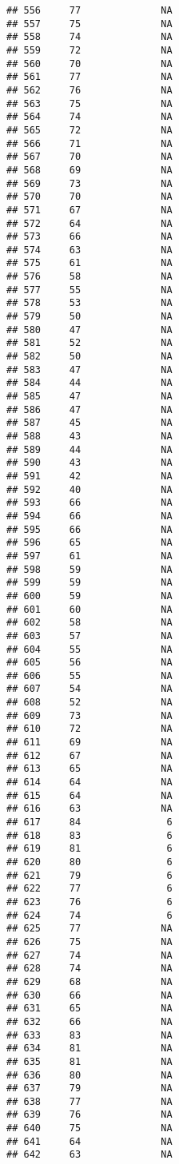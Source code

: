 \documentclass[]{article}
\begin{document}
\begin{verbatim}
## 556     77              NA
## 557     75              NA
## 558     74              NA
## 559     72              NA
## 560     70              NA
## 561     77              NA
## 562     76              NA
## 563     75              NA
## 564     74              NA
## 565     72              NA
## 566     71              NA
## 567     70              NA
## 568     69              NA
## 569     73              NA
## 570     70              NA
## 571     67              NA
## 572     64              NA
## 573     66              NA
## 574     63              NA
## 575     61              NA
## 576     58              NA
## 577     55              NA
## 578     53              NA
## 579     50              NA
## 580     47              NA
## 581     52              NA
## 582     50              NA
## 583     47              NA
## 584     44              NA
## 585     47              NA
## 586     47              NA
## 587     45              NA
## 588     43              NA
## 589     44              NA
## 590     43              NA
## 591     42              NA
## 592     40              NA
## 593     66              NA
## 594     66              NA
## 595     66              NA
## 596     65              NA
## 597     61              NA
## 598     59              NA
## 599     59              NA
## 600     59              NA
## 601     60              NA
## 602     58              NA
## 603     57              NA
## 604     55              NA
## 605     56              NA
## 606     55              NA
## 607     54              NA
## 608     52              NA
## 609     73              NA
## 610     72              NA
## 611     69              NA
## 612     67              NA
## 613     65              NA
## 614     64              NA
## 615     64              NA
## 616     63              NA
## 617     84               6
## 618     83               6
## 619     81               6
## 620     80               6
## 621     79               6
## 622     77               6
## 623     76               6
## 624     74               6
## 625     77              NA
## 626     75              NA
## 627     74              NA
## 628     74              NA
## 629     68              NA
## 630     66              NA
## 631     65              NA
## 632     66              NA
## 633     83              NA
## 634     81              NA
## 635     81              NA
## 636     80              NA
## 637     79              NA
## 638     77              NA
## 639     76              NA
## 640     75              NA
## 641     64              NA
## 642     63              NA

\end{verbatim}
\end{document}

